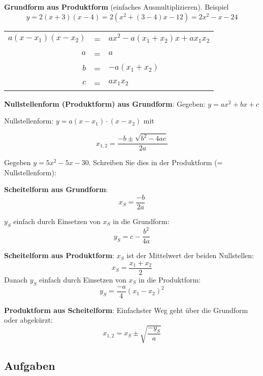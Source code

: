 \textbf{Grundform aus Produktform} (einfaches Ausmultiplizieren). Beispiel
$$y=2(x+3)(x-4)=2(x^2 +(3-4)x - 12) = 2x^2-x-24$$

\begin{tabular}{rcl}
  $a(x-x_1)(x-x_2)$ &=& $ax^2 - a(x_1+x_2)x + ax_1x_2$\\
  $a$ &=& $a$ \\
  $b$ &=& $-a(x_1+x_2)$\\
  $c$ &=& $ax_1x_2$
\end{tabular}


\textbf{Nullstellenform (Produktform) aus Grundform}:
Gegeben: $y = ax^2 + bx + c$

Nullstellenform: $y = a(x-x_1)\cdot{}(x-x_2)$ mit

$$x_{1,2} = \frac{-b \pm \sqrt{b^2-4ac}}{2a}$$

\begin{beispiel}{}{}
Gegeben $y = 5x^2 - 5x - 30$. Schreiben Sie dies in der Produktform (=
Nullstellenform):
\end{beispiel}
\newpage


\textbf{Scheitelform aus Grundform}:
$$x_S=\frac{-b}{2a}$$

$y_S$ einfach durch Einsetzen von $x_S$ in die Grundform:
$$y_S=c-\frac{b^2}{4a}$$
 
\textbf{Scheitelform aus Produktform}: $x_S$ ist der Mittelwert der beiden
Nullstellen:
$$x_S=\frac{x_1+x_2}{2}$$
Danach $y_S$ einfach durch Einsetzen von $x_S$ in die Produktform:
$$y_S=\frac{-a}{4}(x_1-x_2)^2$$

\textbf{Produktform aus Scheitelform}: Einfachster Weg geht über die Grundform oder abgekürzt:
$$x_{1,2} =x_S \pm \sqrt{\frac{-y_S}{a}}$$


\subsection{Aufgaben}
